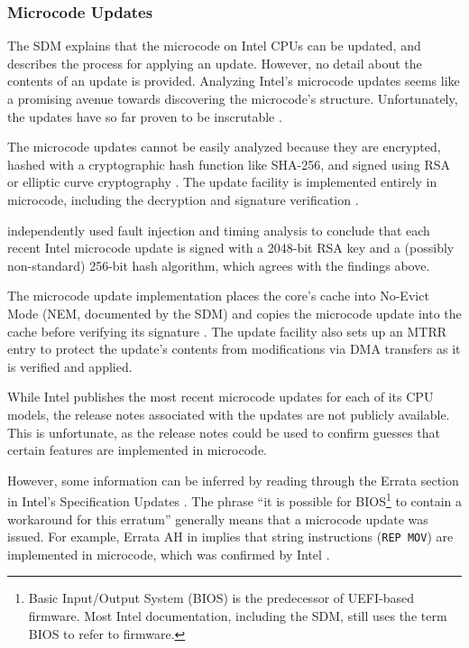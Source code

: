 \subsubsection{Microcode Updates}
\label{microcode:updates}

The SDM explains that the microcode on Intel CPUs can be updated, and describes
the process for applying an update. However, no detail about the contents of an
update is provided. Analyzing Intel's microcode updates seems like a promising
avenue towards discovering the microcode's structure. Unfortunately, the
updates have so far proven to be inscrutable \cite{chen2014microcode}.


The microcode updates cannot be easily analyzed because they are encrypted,
hashed with a cryptographic hash function like SHA-256, and signed using RSA or
elliptic curve cryptography \cite{intel2012patching}. The update facility is
implemented entirely in microcode, including the decryption and signature
verification \cite{intel2012patching}.

\cite{hawkes2012microcode} independently used fault injection and timing
analysis to conclude that each recent Intel microcode update is signed with a
2048-bit RSA key and a (possibly non-standard) 256-bit hash algorithm, which
agrees with the findings above.


The microcode update implementation places the core's cache into No-Evict Mode
(NEM, documented by the SDM) and copies the microcode update into the cache
before verifying its signature \cite{intel2012patching}. The update facility
also sets up an MTRR entry to protect the update's contents from modifications
via DMA transfers \cite{intel2012patching} as it is verified and applied.

While Intel publishes the most recent microcode updates for each of its CPU
models, the release notes associated with the updates are not publicly
available. This is unfortunate, as the release notes could be used to confirm
guesses that certain features are implemented in microcode.

However, some information can be inferred by reading through the Errata section
in Intel's Specification Updates
\cite{intel2010errata, intel2015errata, intel2015errata2}. The phrase ``it is
possible for BIOS\footnote{Basic Input/Output System (BIOS) is the predecessor
of UEFI-based firmware. Most Intel documentation, including the SDM, still uses
the term BIOS to refer to firmware.} to contain a workaround for this erratum''
generally means that a microcode update was issued. For example, Errata AH in
\cite{intel2010errata} implies that string instructions (\texttt{REP MOV}) are
implemented in microcode, which was confirmed by Intel
\cite{abraham2006repmov}.

